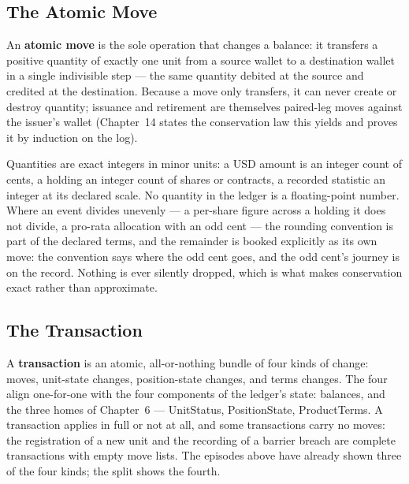 \documentclass[11pt,a4paper]{article}
\begin{document}
\subsection{The Atomic Move}

An \textbf{atomic move} is the sole operation that changes a balance: it transfers a
positive quantity of exactly one unit from a source wallet to a destination wallet in a
single indivisible step --- the same quantity debited at the source and credited at the
destination. Because a move only transfers, it can never create or destroy quantity;
issuance and retirement are themselves paired-leg moves against the issuer's wallet
(Chapter~14 states the conservation law this yields and proves it by induction on the
log).

Quantities are exact integers in minor units: a USD amount is an integer count of cents,
a holding an integer count of shares or contracts, a recorded statistic an integer at
its declared scale. No quantity in the ledger is a floating-point number. Where an event
divides unevenly --- a per-share figure across a holding it does not divide, a pro-rata
allocation with an odd cent --- the rounding convention is part of the declared terms,
and the remainder is booked explicitly as its own move: the convention says where the
odd cent goes, and the odd cent's journey is on the record. Nothing is ever silently
dropped, which is what makes conservation exact rather than approximate.

\subsection{The Transaction}

A \textbf{transaction} is an atomic, all-or-nothing bundle of four kinds of change:
moves, unit-state changes, position-state changes, and terms changes. The four align
one-for-one with the four components of the ledger's state: balances, and the three
homes of Chapter~6 --- UnitStatus, PositionState, ProductTerms. A transaction applies in
full or not at all, and some transactions carry no moves: the registration of a new unit
and the recording of a barrier breach are complete transactions with empty move lists.
The episodes above have already shown three of the four kinds; the split shows the
fourth.
\end{document}
